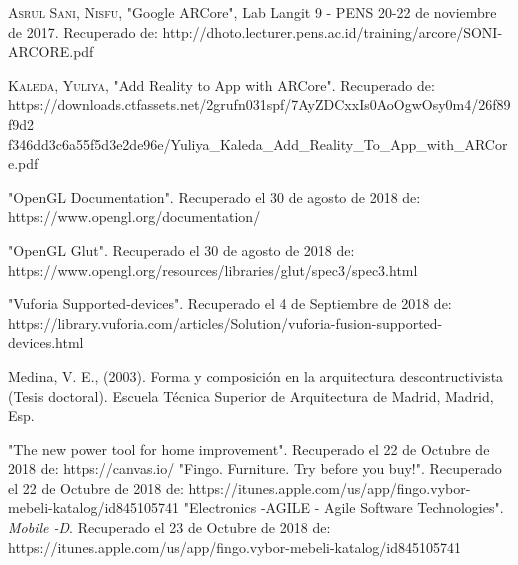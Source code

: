 \begin{thebibliography}{X}
	
	 \textsc{Asrul Sani, Nisfu}, "Google ARCore", Lab Langit 9 - PENS 20-22 de noviembre de 2017. Recuperado de: http://dhoto.lecturer.pens.ac.id/training/arcore/SONI-ARCORE.pdf
	
	 \textsc{Kaleda, Yuliya}, "Add Reality to App with ARCore". Recuperado de: https://downloads.ctfassets.net/2grufn031spf/7AyZDCxxIs0AoOgwOsy0m4/26f89f9d2
	f346dd3c6a55f5d3e2de96e/Yuliya\_Kaleda\_Add\_Reality\_To\_App\_with\_ARCore.pdf
	

	
	
	
	 "OpenGL Documentation". Recuperado el 30 de agosto de 2018 de: https://www.opengl.org/documentation/
	
	 "OpenGL Glut". Recuperado el 30 de agosto de 2018 de: https://www.opengl.org/resources/libraries/glut/spec3/spec3.html
	
    
	
	 "Vuforia Supported-devices". Recuperado el 4 de Septiembre de 2018 de: https://library.vuforia.com/articles/Solution/vuforia-fusion-supported-devices.html
	
	 Medina, V. E., (2003). Forma y composición en la arquitectura descontructivista (Tesis doctoral). Escuela Técnica Superior de Arquitectura de Madrid, Madrid, Esp.
	
	 "The new power tool for home improvement". Recuperado el 22 de Octubre de 2018 de: https://canvas.io/
	 "Fingo. Furniture. Try before you buy!". Recuperado el 22 de Octubre de 2018 de: https://itunes.apple.com/us/app/fingo.vybor-mebeli-katalog/id845105741
	 "Electronics -AGILE - Agile Software Technologies". \textit{Mobile -D}. Recuperado el 23 de Octubre de 2018 de: https://itunes.apple.com/us/app/fingo.vybor-mebeli-katalog/id845105741
	
	
\end{thebibliography}
